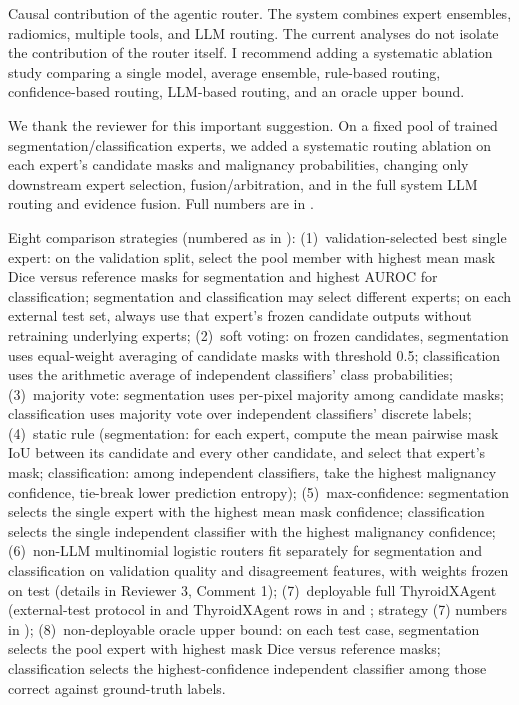 \begin{reviewercomment}
Causal contribution of the agentic router. The system combines expert ensembles, radiomics, multiple tools, and LLM routing. The current analyses do not isolate the contribution of the router itself. I recommend adding a systematic ablation study comparing a single model, average ensemble, rule-based routing, confidence-based routing, LLM-based routing, and an oracle upper bound.
\end{reviewercomment}
\begin{authorresponse}
We thank the reviewer for this important suggestion. On a fixed pool of trained segmentation/classification experts, we added a systematic routing ablation on each expert's candidate masks and malignancy probabilities, changing only downstream expert selection, fusion/arbitration, and in the full system LLM routing and evidence fusion. Full numbers are in .\par
Eight comparison strategies (numbered as in ): (1)~validation-selected best single expert: on the validation split, select the pool member with highest mean mask Dice versus reference masks for segmentation and highest AUROC for classification; segmentation and classification may select different experts; on each external test set, always use that expert's frozen candidate outputs without retraining underlying experts; (2)~soft voting: on frozen candidates, segmentation uses equal-weight averaging of candidate masks with threshold 0.5; classification uses the arithmetic average of independent classifiers' class probabilities; (3)~majority vote: segmentation uses per-pixel majority among candidate masks; classification uses majority vote over independent classifiers' discrete labels; (4)~static rule (segmentation: for each expert, compute the mean pairwise mask IoU between its candidate and every other candidate, and select that expert's mask; classification: among independent classifiers, take the highest malignancy confidence, tie-break lower prediction entropy); (5)~max-confidence: segmentation selects the single expert with the highest mean mask confidence; classification selects the single independent classifier with the highest malignancy confidence; (6)~non-LLM multinomial logistic routers fit separately for segmentation and classification on validation quality and disagreement features, with weights frozen on test (details in Reviewer 3, Comment 1); (7)~deployable full ThyroidXAgent (external-test protocol in  and ThyroidXAgent rows in  and ; strategy (7) numbers in ); (8)~non-deployable oracle upper bound: on each test case, segmentation selects the pool expert with highest mask Dice versus reference masks; classification selects the highest-confidence independent classifier among those correct against ground-truth labels.\par

\end{authorresponse}
